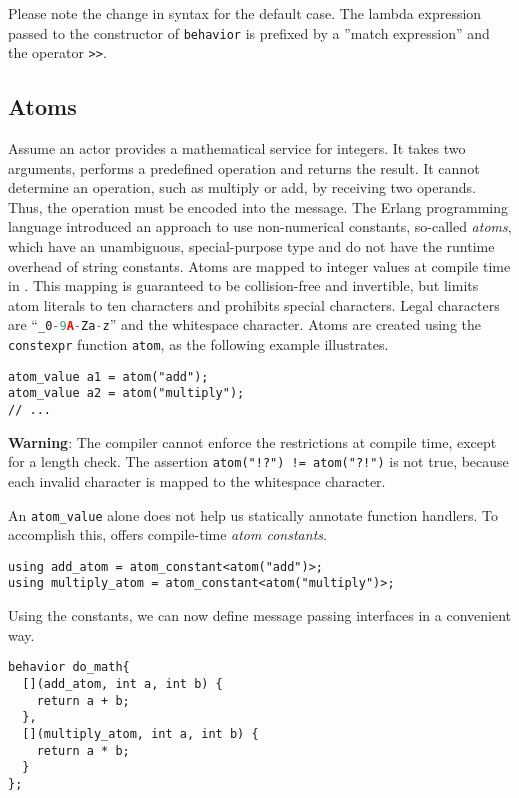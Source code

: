 Please note the change in syntax for the default case.
The lambda expression passed to the constructor of \lstinline^behavior^ is prefixed by a ''match expression'' and the operator \lstinline^>>^.

\subsection{Atoms}
\label{Sec::PatternMatching::Atoms}

Assume an actor provides a mathematical service for integers.
It takes two arguments, performs a predefined operation and returns the result.
It cannot determine an operation, such as multiply or add, by receiving two operands.
Thus, the operation must be encoded into the message.
The Erlang programming language introduced an approach to use non-numerical
constants, so-called \textit{atoms}, which have an unambiguous, special-purpose type and do not have the runtime overhead of string constants.
Atoms are mapped to integer values at compile time in \lib.
This mapping is guaranteed to be collision-free and invertible, but limits atom literals to ten characters and prohibits special characters.
Legal characters are ``\lstinline[language=C++]^_0-9A-Za-z^'' and the whitespace character.
Atoms are created using the \lstinline^constexpr^ function \lstinline^atom^, as the following example illustrates.

\begin{lstlisting}
atom_value a1 = atom("add");
atom_value a2 = atom("multiply");
// ...
\end{lstlisting}

\textbf{Warning}: The compiler cannot enforce the restrictions at compile time, except for a length check.
The assertion \lstinline^atom("!?") != atom("?!")^ is not true, because each invalid character is mapped to the whitespace character.

An \lstinline^atom_value^ alone does not help us statically annotate function handlers.
To accomplish this, \lib offers compile-time \emph{atom constants}.

\begin{lstlisting}
using add_atom = atom_constant<atom("add")>;
using multiply_atom = atom_constant<atom("multiply")>;
\end{lstlisting}

Using the constants, we can now define message passing interfaces in a convenient way.
\begin{lstlisting}
behavior do_math{
  [](add_atom, int a, int b) {
    return a + b;
  },
  [](multiply_atom, int a, int b) {
    return a * b;
  }
};
\end{lstlisting}

